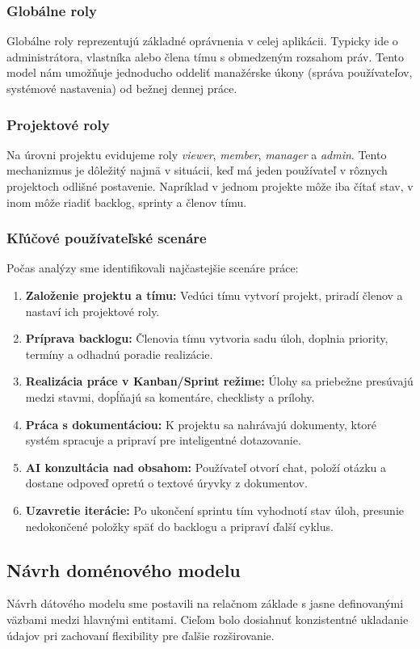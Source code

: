 \documentclass[12pt, a4paper]{article}
\begin{document}
\begin{titlepage}
\subsubsection{Globálne roly}
Globálne roly reprezentujú základné oprávnenia v celej aplikácii. Typicky ide o administrátora, vlastníka alebo člena tímu s obmedzeným rozsahom práv. Tento model nám umožňuje jednoducho oddeliť manažérske úkony (správa používateľov, systémové nastavenia) od bežnej dennej práce.

\subsubsection{Projektové roly}
Na úrovni projektu evidujeme roly \textit{viewer}, \textit{member}, \textit{manager} a \textit{admin}. Tento mechanizmus je dôležitý najmä v situácii, keď má jeden používateľ v rôznych projektoch odlišné postavenie. Napríklad v jednom projekte môže iba čítať stav, v inom môže riadiť backlog, sprinty a členov tímu.

\subsubsection{Kľúčové používateľské scenáre}
Počas analýzy sme identifikovali najčastejšie scenáre práce:
\begin{enumerate}
    \item \textbf{Založenie projektu a tímu:} Vedúci tímu vytvorí projekt, priradí členov a nastaví ich projektové roly.
    \item \textbf{Príprava backlogu:} Členovia tímu vytvoria sadu úloh, doplnia priority, termíny a odhadnú poradie realizácie.
    \item \textbf{Realizácia práce v Kanban/Sprint režime:} Úlohy sa priebežne presúvajú medzi stavmi, dopĺňajú sa komentáre, checklisty a prílohy.
    \item \textbf{Práca s dokumentáciou:} K projektu sa nahrávajú dokumenty, ktoré systém spracuje a pripraví pre inteligentné dotazovanie.
    \item \textbf{AI konzultácia nad obsahom:} Používateľ otvorí chat, položí otázku a dostane odpoveď opretú o textové úryvky z dokumentov.
    \item \textbf{Uzavretie iterácie:} Po ukončení sprintu tím vyhodnotí stav úloh, presunie nedokončené položky späť do backlogu a pripraví ďalší cyklus.
\end{enumerate}

\subsection{Návrh doménového modelu}
Návrh dátového modelu sme postavili na relačnom základe s jasne definovanými väzbami medzi hlavnými entitami. Cieľom bolo dosiahnuť konzistentné ukladanie údajov pri zachovaní flexibility pre ďalšie rozširovanie.


\end{titlepage}
\end{document}
